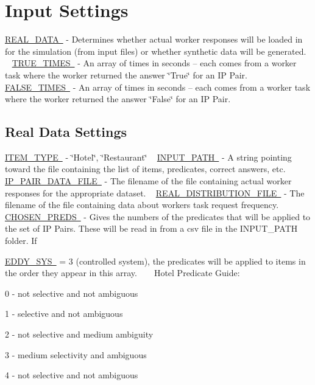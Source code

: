 \hypertarget{toggles_input}{}\section{Input Settings}\label{toggles_input}
\mbox{\hyperlink{}{R\+E\+A\+L\+\_\+\+D\+A\+TA }} -\/ Determines whether actual worker responses will be loaded in for the simulation (from input files) or whether synthetic data will be generated. ~\newline
 \mbox{\hyperlink{}{T\+R\+U\+E\+\_\+\+T\+I\+M\+ES }} -\/ An array of times in seconds -- each comes from a worker task where the worker returned the answer \char`\"{}\+True\char`\"{} for an IP Pair. ~\newline
 \mbox{\hyperlink{}{F\+A\+L\+S\+E\+\_\+\+T\+I\+M\+ES }} -\/ An array of times in seconds -- each comes from a worker task where the worker returned the answer \char`\"{}\+False\char`\"{} for an IP Pair.\hypertarget{toggles_realdata}{}\subsection{Real Data Settings}\label{toggles_realdata}
\mbox{\hyperlink{}{I\+T\+E\+M\+\_\+\+T\+Y\+PE }} -\/ \char`\"{}\+Hotel\char`\"{}, \char`\"{}\+Restaurant\char`\"{} ~\newline
 \mbox{\hyperlink{}{I\+N\+P\+U\+T\+\_\+\+P\+A\+TH }} -\/ A string pointing toward the file containing the list of items, predicates, correct answers, etc.~\newline
 \mbox{\hyperlink{}{I\+P\+\_\+\+P\+A\+I\+R\+\_\+\+D\+A\+T\+A\+\_\+\+F\+I\+LE }} -\/ The filename of the file containing actual worker responses for the appropriate dataset. ~\newline
 \mbox{\hyperlink{}{R\+E\+A\+L\+\_\+\+D\+I\+S\+T\+R\+I\+B\+U\+T\+I\+O\+N\+\_\+\+F\+I\+LE }} -\/ The filename of the file containing data about workers\textquotesingle{} task request frequency. ~\newline
 \mbox{\hyperlink{}{C\+H\+O\+S\+E\+N\+\_\+\+P\+R\+E\+DS }} -\/ Gives the numbers of the predicates that will be applied to the set of IP Pairs. These will be read in from a csv file in the I\+N\+P\+U\+T\+\_\+\+P\+A\+TH folder. If

\mbox{\hyperlink{}{E\+D\+D\+Y\+\_\+\+S\+YS }} = 3 (controlled system), the predicates will be applied to items in the order they appear in this array. ~\newline
~\newline
Hotel Predicate Guide\+:
\begin{DoxyItemize}
\item 0 -\/ not selective and not ambiguous
\item 1 -\/ selective and not ambiguous
\item 2 -\/ not selective and medium ambiguity
\item 3 -\/ medium selectivity and ambiguous
\item 4 -\/ not selective and not ambiguous
\end{DoxyItemize}

